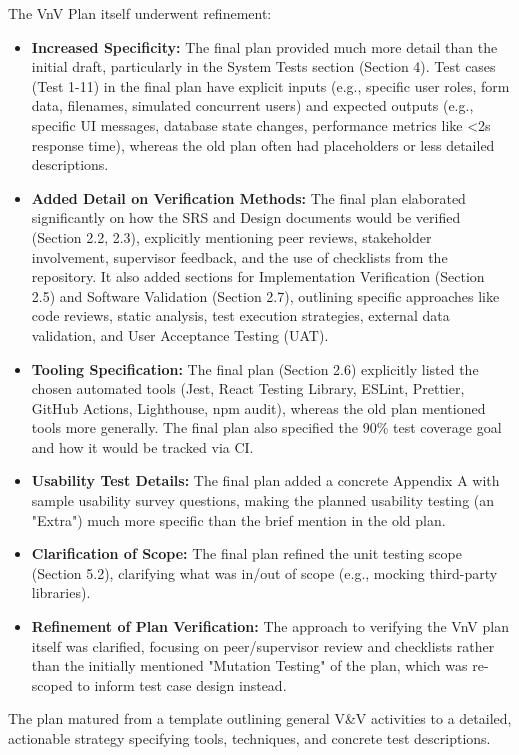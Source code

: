 \documentclass{article}
\begin{document}
The VnV Plan itself underwent refinement:
\begin{itemize}
    \item \textbf{Increased Specificity:} The final plan provided much more detail than the initial draft, particularly in the System Tests section (Section 4). Test cases (Test 1-11) in the final plan have explicit inputs (e.g., specific user roles, form data, filenames, simulated concurrent users) and expected outputs (e.g., specific UI messages, database state changes, performance metrics like <2s response time), whereas the old plan often had placeholders or less detailed descriptions.
    \item \textbf{Added Detail on Verification Methods:} The final plan elaborated significantly on how the SRS and Design documents would be verified (Section 2.2, 2.3), explicitly mentioning peer reviews, stakeholder involvement, supervisor feedback, and the use of checklists from the repository. It also added sections for Implementation Verification (Section 2.5) and Software Validation (Section 2.7), outlining specific approaches like code reviews, static analysis, test execution strategies, external data validation, and User Acceptance Testing (UAT).
    \item \textbf{Tooling Specification:} The final plan (Section 2.6) explicitly listed the chosen automated tools (Jest, React Testing Library, ESLint, Prettier, GitHub Actions, Lighthouse, npm audit), whereas the old plan mentioned tools more generally. The final plan also specified the 90\% test coverage goal and how it would be tracked via CI.
    \item \textbf{Usability Test Details:} The final plan added a concrete Appendix A with sample usability survey questions, making the planned usability testing (an "Extra") much more specific than the brief mention in the old plan.
    \item \textbf{Clarification of Scope:} The final plan refined the unit testing scope (Section 5.2), clarifying what was in/out of scope (e.g., mocking third-party libraries).
    \item \textbf{Refinement of Plan Verification:} The approach to verifying the VnV plan itself was clarified, focusing on peer/supervisor review and checklists rather than the initially mentioned "Mutation Testing" of the plan, which was re-scoped to inform test case design instead.
\end{itemize}
The plan matured from a template outlining general V\&V activities to a detailed, actionable strategy specifying tools, techniques, and concrete test descriptions.
\end{document}
